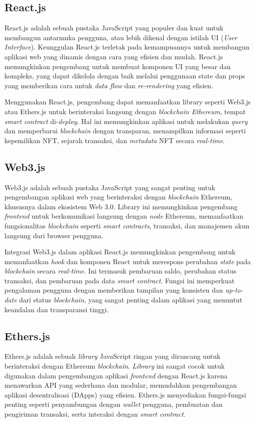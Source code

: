 \subsection{React.js}
React.js adalah sebuah pustaka JavaScript yang populer dan kuat untuk membangun antarmuka pengguna, atau lebih dikenal dengan istilah UI (\emph{User Interface}). Keunggulan React.js terletak pada kemampuannya untuk membangun aplikasi web yang dinamis dengan cara yang efisien dan mudah. React.js memungkinkan pengembang untuk membuat komponen UI yang besar dan kompleks, yang dapat dikelola dengan baik melalui penggunaan state dan props yang memberikan cara untuk \emph{data flow} dan \emph{re-rendering} yang efisien. 

Menggunakan React.js, pengembang dapat memanfaatkan library seperti Web3.js atau Ethers.js untuk berinteraksi langsung dengan \emph{blockchain Ethereum}, tempat \emph{smart contract} di-\emph{deploy}. Hal ini memungkinkan aplikasi untuk melakukan \emph{query} dan memperbarui \emph{blockchain} dengan transparan, menampilkan informasi seperti kepemilikan NFT, sejarah transaksi, dan \emph{metadata} NFT secara \emph{real-time}. 

\subsection{Web3.js}
Web3.js adalah sebuah pustaka JavaScript yang sangat penting untuk pengembangan aplikasi web yang berinteraksi dengan \emph{blockchain} Ethereum, khususnya dalam ekosistem Web 3.0. Library ini memungkinkan pengembang \emph{frontend} untuk berkomunikasi langsung dengan \emph{node} Ethereum, memanfaatkan fungsionalitas \emph{blockchain} seperti \emph{smart contracts}, transaksi, dan manajemen akun langsung dari browser pengguna.

Integrasi Web3.js dalam aplikasi React.js memungkinkan pengembang untuk memanfaatkan \emph{hook} dan komponen React untuk merespons perubahan \emph{state} pada \emph{blockchain} secara \emph{real-time}. Ini termasuk pembaruan saldo, perubahan status transaksi, dan pembaruan pada data \emph{smart contract}. Fungsi ini memperkuat pengalaman pengguna dengan memberikan tampilan yang konsisten dan \emph{up-to-date} dari status \emph{blockchain}, yang sangat penting dalam aplikasi yang menuntut keandalan dan transparansi tinggi.

\subsection{Ethers.js}
Ethers.js adalah sebuah \emph{library} JavaScript ringan yang dirancang untuk berinteraksi dengan Ethereum \emph{blockchain}. \emph{Library} ini sangat cocok untuk digunakan dalam pengembangan aplikasi \emph{frontend} dengan React.js karena menawarkan API yang sederhana dan modular, memudahkan pengembangan aplikasi desentralisasi (DApps) yang efisien. Ethers.js menyediakan fungsi-fungsi penting seperti penyambungan dengan \emph{wallet} pengguna, pembuatan dan pengiriman transaksi, serta interaksi dengan \emph{smart contract}.

